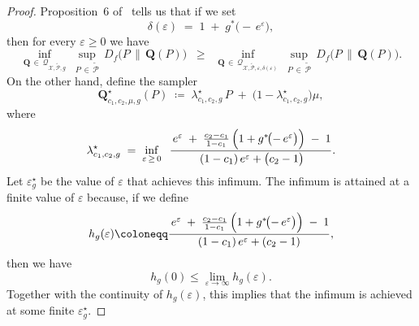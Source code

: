 \documentclass[accepted]{article}
\theoremstyle{plain} %
\theoremstyle{definition}
\theoremstyle{remark}
\newcommand{\eps}{\varepsilon}
\newcommand{\bQ}{\mathbf{Q}}
\begin{document}
\begin{proof}
           Proposition~6 of~\citet{dong2022gaussian} tells us that if we set
\[
\delta(\varepsilon) \;=\; 1 \;+\; g^*\!\bigl(-\,e^\varepsilon\bigr),
\]
then for every $\varepsilon \geq 0$ we have
\begin{equation}\label{eqn: functional lower bounded by appx}
    \inf_{\bQ \,\in\, \mathcal{Q}_{\mathcal{X}, \tilde{\mathcal{P}}, g}} 
    \;\sup_{P \,\in\, \tilde{\mathcal{P}}}
    \,D_f\bigl(P \,\|\, \bQ(P)\bigr) 
    \;\;\ge\;\; 
    \inf_{\bQ \,\in\, \mathcal{Q}_{\mathcal{X}, \tilde{\mathcal{P}}, \varepsilon, \delta(\varepsilon)}} 
    \;\sup_{P \,\in\, \tilde{\mathcal{P}}}
    \,D_f\bigl(P \,\|\, \bQ(P)\bigr).
\end{equation}
On the other hand, define the sampler 
\[
\bQ^\star_{c_1,c_2,\mu,g}(P) 
\;\coloneqq\; 
\lambda^\star_{c_1,c_2,g}\,P \;+\; \bigl(1 - \lambda^\star_{c_1,c_2,g}\bigr)\mu,
\]
where
\[
\lambda^\star_{c_1,c_2,g} 
\;=\;
\inf_{\eps  \,\ge\, 0}
\;\;
\frac{\,e^\eps  \;+\; \tfrac{c_2 - c_1}{1 - c_1}\,\Bigl(1 + g^*\!\bigl(-\,e^\eps \bigr)\Bigr) \;-\; 1}
     {\,(1 - c_1)\,e^\eps  + \bigl(c_2 - 1\bigr)}.
\]
Let $\varepsilon^\star_g$ be the value of $\varepsilon$ that achieves this infimum. The infimum is attained at a finite value of $\varepsilon$ because, if we define
\[
h_g(\varepsilon) \coloneqq \frac{\,e^\varepsilon \;+\; \tfrac{c_2 - c_1}{1 - c_1}\,\Bigl(1 + g^*\!\bigl(-\,e^\varepsilon\bigr)\Bigr) \;-\; 1}
{(1 - c_1)\,e^\varepsilon + (c_2 - 1)},
\]
then we have
\[
h_g(0) \leq \lim_{\varepsilon \to \infty} h_g(\varepsilon).
\]
Together with the continuity of $h_g(\varepsilon)$, this implies that the infimum is achieved at some finite $\varepsilon_g^\star$.


\end{proof}
\end{document}
